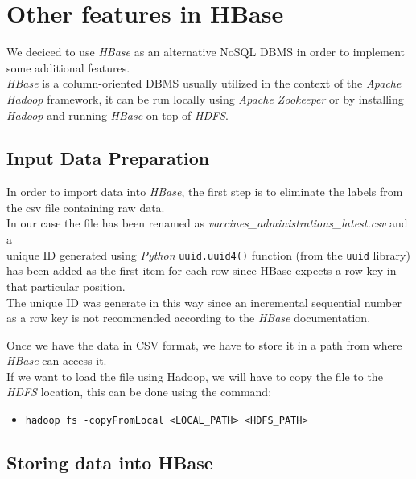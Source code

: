 \documentclass[12pt, a4paper]{article}
\begin{document}
\section{Other features in HBase} 

We deciced to use \emph{HBase} as an alternative NoSQL DBMS in order to implement some 
additional features. \\
\emph{HBase} is a column-oriented DBMS usually utilized in the context of the 
\emph{Apache Hadoop} framework, it can be run locally using \emph{Apache Zookeeper} or 
by installing \emph{Hadoop} and running \emph{HBase} on top of \emph{HDFS}.

\subsection{Input Data Preparation}

In order to import data into \emph{HBase}, the first step is to eliminate the labels 
from the csv file containing raw data. \\
In our case the file has been renamed as \emph{vaccines\_administrations\_latest.csv} 
and a \\ unique ID generated using \emph{Python} \texttt{uuid.uuid4()} function 
(from the \texttt{uuid} library) has been added as the first item for each row since
HBase expects a row key in that particular position. \\ 
The unique ID was generate in this way since an incremental sequential number as a 
row key is not recommended according to the \emph{HBase} documentation. 

\noindent
Once we have the data in CSV format, we have to store it in a path from where 
\emph{HBase} can access it. \\
If we want to load the file using Hadoop, we will have to copy the file to the 
\emph{HDFS} location, this can be done using the command:
\begin{footnotesize}
  \begin{itemize}
    \item[] \texttt{hadoop fs -copyFromLocal <LOCAL\_PATH>  <HDFS\_PATH>} 
  \end{itemize}
\end{footnotesize}

\subsection{Storing data into HBase}
\end{document}
